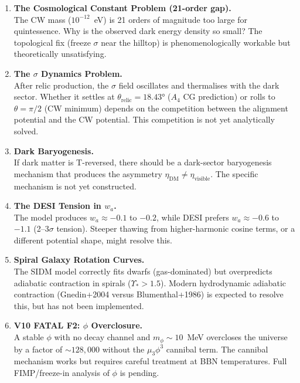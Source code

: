 \documentclass[12pt, a4paper]{article}
\begin{document}
\begin{enumerate}

\item \textbf{The Cosmological Constant Problem (21-order gap).}\\
  The CW mass ($10^{-12}$~eV) is 21 orders of magnitude too large for quintessence. Why is the observed dark energy density so small? The topological fix (freeze $\sigma$ near the hilltop) is phenomenologically workable but theoretically unsatisfying.

\item \textbf{The $\sigma$ Dynamics Problem.}\\
  After relic production, the $\sigma$ field oscillates and thermalises with the dark sector. Whether it settles at $\theta_\text{relic} = 18.43°$ ($A_4$ CG prediction) or rolls to $\theta = \pi/2$ (CW minimum) depends on the competition between the alignment potential and the CW potential. This competition is not yet analytically solved.

\item \textbf{Dark Baryogenesis.}\\
  If dark matter is T-reversed, there should be a dark-sector baryogenesis mechanism that produces the asymmetry $\eta_\text{DM} \neq \eta_\text{visible}$. The specific mechanism is not yet constructed.

\item \textbf{The DESI Tension in $w_a$.}\\
  The model produces $w_a \approx -0.1$ to $-0.2$, while DESI prefers $w_a \approx -0.6$ to $-1.1$ (2--3$\sigma$ tension). Steeper thawing from higher-harmonic cosine terms, or a different potential shape, might resolve this.

\item \textbf{Spiral Galaxy Rotation Curves.}\\
  The SIDM model correctly fits dwarfs (gas-dominated) but overpredicts adiabatic contraction in spirals ($\Upsilon_* > 1.5$). Modern hydrodynamic adiabatic contraction (Gnedin+2004 versus Blumenthal+1986) is expected to resolve this, but has not been implemented.

\item \textbf{V10 FATAL F2: $\phi$ Overclosure.}\\
  A stable $\phi$ with no decay channel and $m_\phi \sim 10$~MeV overcloses the universe by a factor of $\sim 128{,}000$ without the $\mu_3\phi^3$ cannibal term. The cannibal mechanism works but requires careful treatment at BBN temperatures. Full FIMP/freeze-in analysis of $\phi$ is pending.

\end{enumerate}
\end{document}
